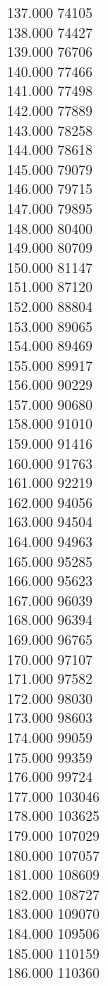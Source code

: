 { 137.000	74105 \\
 138.000	74427 \\
 139.000	76706 \\
 140.000	77466 \\
 141.000	77498 \\
 142.000	77889 \\
 143.000	78258 \\
 144.000	78618 \\
 145.000	79079 \\
 146.000	79715 \\
 147.000	79895 \\
 148.000	80400 \\
 149.000	80709 \\
 150.000	81147 \\
 151.000	87120 \\
 152.000	88804 \\
 153.000	89065 \\
 154.000	89469 \\
 155.000	89917 \\
 156.000	90229 \\
 157.000	90680 \\
 158.000	91010 \\
 159.000	91416 \\
 160.000	91763 \\
 161.000	92219 \\
 162.000	94056 \\
 163.000	94504 \\
 164.000	94963 \\
 165.000	95285 \\
 166.000	95623 \\
 167.000	96039 \\
 168.000	96394 \\
 169.000	96765 \\
 170.000	97107 \\
 171.000	97582 \\
 172.000	98030 \\
 173.000	98603 \\
 174.000	99059 \\
 175.000	99359 \\
 176.000	99724 \\
 177.000	103046 \\
 178.000	103625 \\
 179.000	107029 \\
 180.000	107057 \\
 181.000	108609 \\
 182.000	108727 \\
 183.000	109070 \\
 184.000	109506 \\
 185.000	110159 \\
 186.000	110360 \\
}
